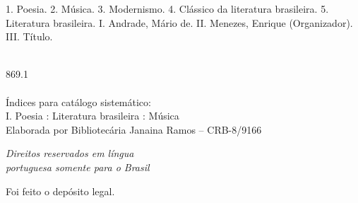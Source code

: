 {\hspace{20pt}\parbox{190pt}{1. Poesia. 2. Música. 3. Modernismo. 4. Clássico da literatura brasileira. 5. Literatura brasileira. I. Andrade, Mário de. II. Menezes, Enrique (Organizador). III. Título.}\\[6pt]

\hspace{188pt} 869.1\\

\hrulefill\\
\noindent{}Índices para catálogo sistemático:\\
\noindent{}I. Poesia : Literatura brasileira : Música\\[6pt]
\noindent{}Elaborada por Bibliotecária Janaina Ramos – CRB-8/9166


\vfill\textit{Direitos reservados em l\'ingua\\ portuguesa somente para o Brasil}\\\medskip

%
\bigskip
Foi feito o depósito legal.\\\endgroup
\pagebreak\raggedleft
\titulagem

{\Large \autor \par\vspace{1.5ex}}
\vspace{8.5mm}

}
